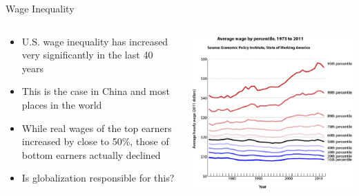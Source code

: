 \documentclass[10pt,hyperref={CJKbookmarks=true},xcolor=dvipsnames,aspectratio=169]{beamer}
\begin{document}
\begin{frame}{Wage Inequality}


\begin{columns}[onlytextwidth]
\begin{column}{0.5\textwidth}
\begin{itemize}
\item U.S. wage inequality has increased very significantly in the last
40 years
\item This is the case in China and most places in the world
\item While real wages of the top earners increased by close to 50\%, those
of bottom earners actually declined 
\item Is globalization responsible for this? 
\end{itemize}

\end{column}
\begin{column}{0.5\textwidth}
\includegraphics[width=0.8\columnwidth]{fig/ho/lec5-1}
\end{column}
\end{columns}

\end{frame}
\end{document}

